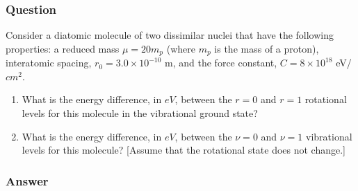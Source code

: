 \subsubsection{Question}
Consider a diatomic molecule of two dissimilar nuclei that have the following properties: a reduced mass $\mu = 20 m_p$ (where $m_p$ is the mass of a proton), interatomic spacing, $r_0 = 3.0\times10^{-10}$ m, and the force constant, $C = 8\times10^{18}$ eV/$cm^2$.
\begin{enumerate}
	\item What is the energy difference, in $eV$, between the $r = 0$ and $r = 1$ rotational levels for this molecule in the vibrational ground state?
	\item What is the energy difference, in $eV$, between the $\nu = 0$ and $\nu = 1$ vibrational levels for this molecule? [Assume that the rotational state does not change.]
\end{enumerate}
\subsubsection{Answer}

